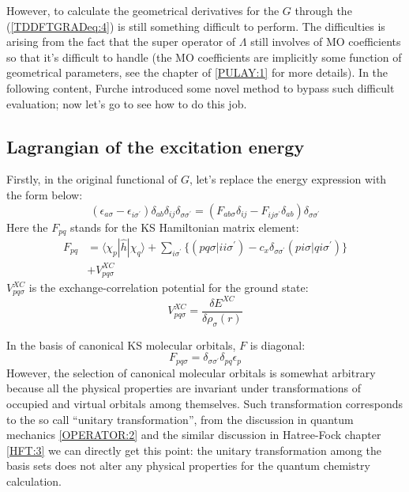 However, to calculate the geometrical derivatives for the $G$
through the (\ref{TDDFTGRADeq:4}) is still something difficult to
perform. The difficulties is arising from the fact that the super
operator of $\Lambda$ still involves of MO coefficients so that it's
difficult to handle (the MO coefficients are implicitly some
function of geometrical parameters, see the chapter of \ref{PULAY:1}
for more details). In the following content,
Furche\cite{furche:7433} introduced some novel method to bypass such
difficult evaluation; now let's go to see how to do this job.

\subsection{Lagrangian of the excitation energy}
%
%
%
%
Firstly, in the original functional of $G$, let's replace the energy
expression with the form below:
\begin{equation}\label{}
(\epsilon_{a\sigma} -
\epsilon_{i\sigma^{'}})\delta_{ab}\delta_{ij}\delta_{\sigma\sigma^{'}}
=(F_{ab\sigma}\delta_{ij} -
F_{ij\sigma^{'}}\delta_{ab})\delta_{\sigma\sigma^{'}}
\end{equation}
Here the $F_{pq}$ stands for the KS Hamiltonian matrix element:
\begin{align}\label{TDDFTGRADeq:5}
F_{pq} &= \langle\chi_{p}|\hat{h}|\chi_{q}\rangle +
\sum_{i\sigma^{'}} \Bigg\{(pq\sigma|ii\sigma^{'}) -
c_{x}\delta_{\sigma\sigma^{'}}(pi\sigma|qi\sigma^{'}) \Bigg\}
\nonumber \\
& + V^{XC}_{pq\sigma}
\end{align}
$V^{XC}_{pq\sigma}$ is the exchange-correlation potential for the
ground state:
\begin{equation}\label{}
V^{XC}_{pq\sigma} = \frac{\delta E^{XC}}{\delta \rho_{\sigma}(r)}
\end{equation}

In the basis of canonical KS molecular orbitals, $F$ is diagonal:
\begin{equation}\label{TDDFTGRADeq:6}
F_{pq\sigma} = \delta_{\sigma\sigma^{'}}\delta_{pq}\epsilon_{p}
\end{equation}
However, the selection of canonical molecular orbitals is somewhat
arbitrary because all the physical properties are invariant under
transformations of occupied and virtual orbitals among themselves.
Such transformation corresponds to the so call ``unitary
transformation'', from the discussion in quantum mechanics
\ref{OPERATOR:2} and the similar discussion in Hatree-Fock chapter
\ref{HFT:3} we can directly get this point: the unitary
transformation among the basis sets does not alter any physical
properties for the quantum chemistry calculation.

